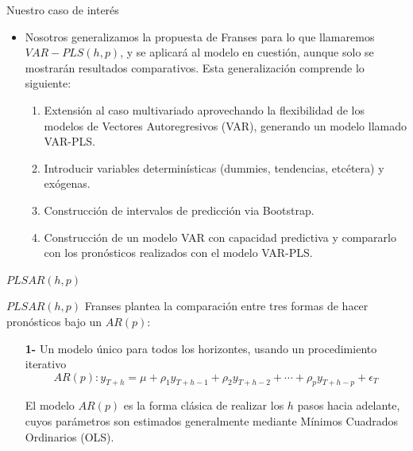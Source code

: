 \documentclass{beamer}
\newcommand{\?}{?`}
\begin{document}
\begin{frame}{Nuestro caso de inter\'es}
  \begin{itemize}
    \item Nosotros generalizamos la propuesta de Franses para lo que
      llamaremos $VAR-PLS(h,p)$, y se aplicar\'a al modelo en
      cuesti\'on, aunque solo se mostrar\'an resultados
      comparativos. Esta generalizaci\'on comprende lo siguiente:
      \begin{enumerate}
      \item Extensi\'on al caso multivariado aprovechando la
        flexibilidad de los modelos de Vectores Autoregresivos (VAR),
        generando un modelo llamado VAR-PLS.
      \item Introducir variables determin\'isticas (dummies,
        tendencias, etc\'etera) y ex\'ogenas.
      \item Construcci\'on de intervalos de predicci\'on via Bootstrap.
      \item Construcci\'on de un modelo VAR con capacidad predictiva y
        compararlo con los pron\'osticos realizados con el modelo
        VAR-PLS.
      \end{enumerate}
  \end{itemize}
\end{frame}

\begin{frame}{}
  \begin{block}{}
    \begin{center}
      \vspace{3mm}
      {\Large $PLSAR(h,p)$}
      \vspace{3mm}
    \end{center}
  \end{block}
\end{frame}

\begin{frame}{$PLSAR(h,p)$}
  Franses plantea la comparaci\'on entre tres formas de hacer
  pron\'osticos bajo un $AR(p)$:
  \begin{itemize}
    \item[\textbf{1-}] Un modelo \'unico para todos los horizontes,
      usando un procedimiento iterativo
      \begin{displaymath}
        AR(p): y_{T+h}=\mu+
        \rho_1y_{T+h-1}+\rho_2y_{T+h-2}+\cdots + \rho_py_{T+h-p} + \epsilon_T
      \end{displaymath}
      
      El modelo $AR(p)$ es la forma cl\'asica de realizar los $h$
      pasos hacia adelante, cuyos par\'ametros son estimados
      generalmente mediante M\'inimos Cuadrados Ordinarios (OLS).
  \end{itemize}
\end{frame}
\end{document}
